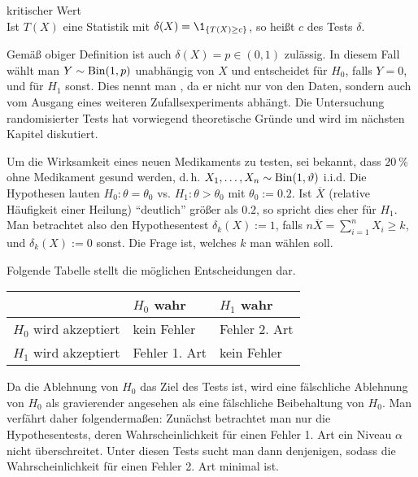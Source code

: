 \begin{Def}{kritischer Wert}\\
    Ist $T(X)$ eine Statistik mit $\delta(X) = \1_{\{T(X) \ge c\}}$, so heißt
    $c$  des Tests $\delta$.
\end{Def}

\begin{Bem}
    Gemäß obiger Definition ist auch $\delta(X) = p \in (0, 1)$ zulässig.
    In diesem Fall wählt man $Y \sim \operatorname{Bin}(1, p)$ unabhängig von $X$ und entscheidet
    für $H_0$, falls $Y = 0$, und für $H_1$ sonst.
    Dies nennt man , da er nicht nur von den Daten,
    sondern auch vom Ausgang eines weiteren Zufallsexperiments abhängt.
    Die Untersuchung randomisierter Tests hat vorwiegend theoretische Gründe und wird im
    nächsten Kapitel diskutiert.
\end{Bem}

\begin{Bsp}
    Um die Wirksamkeit eines neuen Medikaments zu testen, sei bekannt,
    dass $\SI{20}{\percent}$ ohne Medikament gesund werden,
    d.\,h. $X_1, \dotsc, X_n \sim \operatorname{Bin}(1, \vartheta)$ i.i.d.
    Die Hypothesen lauten $H_0\colon \theta = \theta_0$ vs.
    $H_1\colon \theta > \theta_0$ mit $\theta_0 := \num{0.2}$.
    Ist $\overline{X}$
    (relative Häufigkeit einer Heilung) "`deutlich"' größer als $\num{0.2}$,
    so spricht dies eher für $H_1$.
    Man betrachtet also den Hypothesentest
    $\delta_k(X) := 1$, falls $n\overline{X} = \sum_{i=1}^n X_i \ge k$, und
    $\delta_k(X) := 0$ sonst.
    Die Frage ist, welches $k$ man wählen soll.
\end{Bsp}

\begin{Bem}
    Folgende Tabelle stellt die möglichen Entscheidungen dar.

    \begin{tabular}{p{40mm}p{30mm}p{30mm}}
        \toprule
        & $H_0$ wahr & $H_1$ wahr\\
        \midrule
        $H_0$ wird akzeptiert & kein Fehler & Fehler 2. Art\\
        $H_1$ wird akzeptiert & Fehler 1. Art & kein Fehler\\
        \bottomrule
    \end{tabular}

    Da die Ablehnung von $H_0$ das Ziel des Tests ist, wird eine fälschliche Ablehnung von
    $H_0$ als gravierender angesehen als eine fälschliche Beibehaltung von $H_0$.
    Man verfährt daher folgendermaßen:
    Zunächst betrachtet man nur die Hypothesentests,
    deren Wahrscheinlichkeit für einen Fehler 1. Art ein Niveau $\alpha$ nicht überschreitet.
    Unter diesen Tests sucht man dann denjenigen, sodass die Wahrscheinlichkeit für einen
    Fehler 2. Art minimal ist.
\end{Bem}

